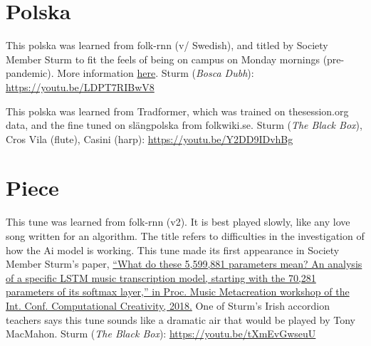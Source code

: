 \documentclass[a4paper,notitlepage,twoside]{book}
\begin{document}
\clearpage
\section{Polska}
{}  
\hypertarget{polska:MaandagpaaKTH}{}
This polska was learned from folk-rnn (v/ Swedish),
and titled by Society Member Sturm to fit the feels of being on campus 
on Monday mornings (pre-pandemic).
More information \href{https://themachinefolksession.org/tune/551}{here}.
Sturm ({\em Bosca Dubh}): \url{https://youtu.be/LDPT7RIBwV8}

{}  
\hypertarget{polska:UgglasPolska}{}
This polska was learned from Tradformer, which was trained on thesession.org data,
and the fine tuned on slängpolska from folkwiki.se.
Sturm ({\em The Black Box}), Cros Vila (flute), Casini (harp): \url{https://youtu.be/Y2DD9IDvhBg}



\clearpage
\section{Piece}
{}
\hypertarget{piece:WhyAreYou}{}
This tune was learned from folk-rnn (v2). 
It is best played slowly, like any love song written for an algorithm.
The title refers to difficulties in the investigation of how the Ai model is working.
This tune made its first appearance in Society Member Sturm's paper, 
\href{http://urn.kb.se/resolve?urn=urn:nbn:se:kth:diva-238604}
{``What do these 5,599,881 parameters mean? 
An analysis of a specific LSTM music transcription model, 
starting with the 70,281 parameters of its softmax layer,” 
in Proc. Music Metacreation workshop of the Int. Conf. Computational Creativity, 2018.}
One of Sturm's Irish accordion teachers says this tune sounds like a dramatic air
that would be played by Tony MacMahon.
Sturm ({\em The Black Box}): \url{https://youtu.be/tXmEvGwseuU}
\end{document}
